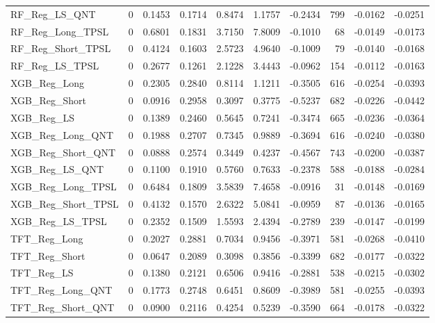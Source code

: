 \begin{tabular}{llrrrrrrrr}
\cline{1-10}
RF\_Reg\_LS\_QNT & 0 & 0.1453 & 0.1714 & 0.8474 & 1.1757 & -0.2434 & 799 & -0.0162 & -0.0251 \\
\cline{1-10}
RF\_Reg\_Long\_TPSL & 0 & 0.6801 & 0.1831 & 3.7150 & 7.8009 & -0.1010 & 68 & -0.0149 & -0.0173 \\
\cline{1-10}
RF\_Reg\_Short\_TPSL & 0 & 0.4124 & 0.1603 & 2.5723 & 4.9640 & -0.1009 & 79 & -0.0140 & -0.0168 \\
\cline{1-10}
RF\_Reg\_LS\_TPSL & 0 & 0.2677 & 0.1261 & 2.1228 & 3.4443 & -0.0962 & 154 & -0.0112 & -0.0163 \\
\cline{1-10}
XGB\_Reg\_Long & 0 & 0.2305 & 0.2840 & 0.8114 & 1.1211 & -0.3505 & 616 & -0.0254 & -0.0393 \\
\cline{1-10}
XGB\_Reg\_Short & 0 & 0.0916 & 0.2958 & 0.3097 & 0.3775 & -0.5237 & 682 & -0.0226 & -0.0442 \\
\cline{1-10}
XGB\_Reg\_LS & 0 & 0.1389 & 0.2460 & 0.5645 & 0.7241 & -0.3474 & 665 & -0.0236 & -0.0364 \\
\cline{1-10}
XGB\_Reg\_Long\_QNT & 0 & 0.1988 & 0.2707 & 0.7345 & 0.9889 & -0.3694 & 616 & -0.0240 & -0.0380 \\
\cline{1-10}
XGB\_Reg\_Short\_QNT & 0 & 0.0888 & 0.2574 & 0.3449 & 0.4237 & -0.4567 & 743 & -0.0200 & -0.0387 \\
\cline{1-10}
XGB\_Reg\_LS\_QNT & 0 & 0.1100 & 0.1910 & 0.5760 & 0.7633 & -0.2378 & 588 & -0.0188 & -0.0284 \\
\cline{1-10}
XGB\_Reg\_Long\_TPSL & 0 & 0.6484 & 0.1809 & 3.5839 & 7.4658 & -0.0916 & 31 & -0.0148 & -0.0169 \\
\cline{1-10}
XGB\_Reg\_Short\_TPSL & 0 & 0.4132 & 0.1570 & 2.6322 & 5.0841 & -0.0959 & 87 & -0.0136 & -0.0165 \\
\cline{1-10}
XGB\_Reg\_LS\_TPSL & 0 & 0.2352 & 0.1509 & 1.5593 & 2.4394 & -0.2789 & 239 & -0.0147 & -0.0199 \\
\cline{1-10}
TFT\_Reg\_Long & 0 & 0.2027 & 0.2881 & 0.7034 & 0.9456 & -0.3971 & 581 & -0.0268 & -0.0410 \\
\cline{1-10}
TFT\_Reg\_Short & 0 & 0.0647 & 0.2089 & 0.3098 & 0.3856 & -0.3399 & 682 & -0.0177 & -0.0322 \\
\cline{1-10}
TFT\_Reg\_LS & 0 & 0.1380 & 0.2121 & 0.6506 & 0.9416 & -0.2881 & 538 & -0.0215 & -0.0302 \\
\cline{1-10}
TFT\_Reg\_Long\_QNT & 0 & 0.1773 & 0.2748 & 0.6451 & 0.8609 & -0.3989 & 581 & -0.0255 & -0.0393 \\
\cline{1-10}
TFT\_Reg\_Short\_QNT & 0 & 0.0900 & 0.2116 & 0.4254 & 0.5239 & -0.3590 & 664 & -0.0178 & -0.0322 \\

\end{tabular}
